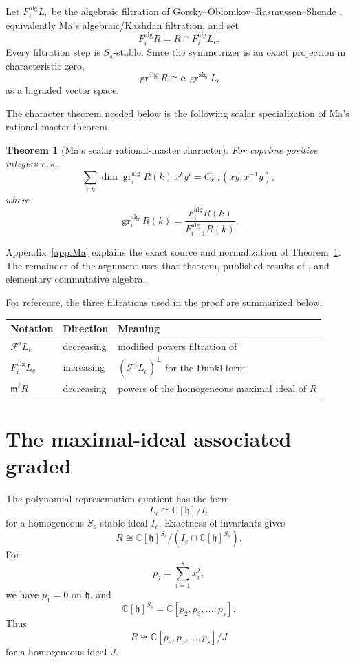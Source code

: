 \documentclass[11pt]{article}
\newtheorem{theorem}{Theorem}[section]
\newcommand{\C}{\mathbb{C}}
\newcommand{\gr}{\operatorname{gr}}
\newcommand{\e}{\mathbf e}
\newcommand{\alg}{\mathrm{alg}}
\begin{document}
Let $F_i^{\alg}L_c$ be the algebraic filtration of
Gorsky--Oblomkov--Rasmussen--Shende \cite{GORS}, equivalently Ma's
algebraic/Kazhdan filtration, and set
\[
 F_i^{\alg}R=R\cap F_i^{\alg}L_c.
\]
Every filtration step is $S_s$-stable.  Since the symmetrizer is an
exact projection in characteristic zero,
\[
 \gr^{\alg}R\cong \e\,\gr^{\alg}L_c
\]
as a bigraded vector space.

The character theorem needed below is the following scalar
specialization of Ma's rational-master theorem.

\begin{theorem}[Ma's scalar rational-master character]
\label{thm:Ma-character}
For coprime positive integers $r,s$,
\begin{equation}\label{eq:Ma-character}
 \sum_{i,k}
 \dim\gr_i^{\alg}R(k)\,x^ky^i
 =C_{r,s}(xy,x^{-1}y),
\end{equation}
where
\[
 \gr_i^{\alg}R(k)
 =\frac{F_i^{\alg}R(k)}{F_{i-1}^{\alg}R(k)}.
\]
\end{theorem}

Appendix~\ref{app:Ma} explains the exact source and normalization of
Theorem~\ref{thm:Ma-character}.  The remainder of the argument uses
that theorem, published results of \cite{GORS}, and elementary
commutative algebra.

For reference, the three filtrations used in the proof are summarized
below.

\begin{center}
\begin{tabular}{@{}lll@{}}
\toprule
Notation & Direction & Meaning \\
\midrule
$\mathcal F^iL_c$ & decreasing & modified powers filtration of \cite{GORS} \\
$F_i^{\alg}L_c$ & increasing & $(\mathcal F^iL_c)^\perp$ for the Dunkl form \\
$\mathfrak m^\ell R$ & decreasing & powers of the homogeneous maximal ideal of $R$ \\
\bottomrule
\end{tabular}
\end{center}

\section{The maximal-ideal associated graded}\label{sec:m-adic}

The polynomial representation quotient has the form
\[
 L_c\cong\C[\mathfrak h]/I_c
\]
for a homogeneous $S_s$-stable ideal $I_c$.  Exactness of invariants
gives
\[
 R\cong
 \C[\mathfrak h]^{S_s}/(I_c\cap\C[\mathfrak h]^{S_s}).
\]
For
\[
 p_j=\sum_{i=1}^s x_i^j,
\]
we have $p_1=0$ on $\mathfrak h$, and
\[
 \C[\mathfrak h]^{S_s}=\C[p_2,p_3,\ldots,p_s].
\]
Thus
\begin{equation}\label{eq:R-presentation}
 R\cong\C[p_2,p_3,\ldots,p_s]/J
\end{equation}
for a homogeneous ideal $J$.
\end{document}
